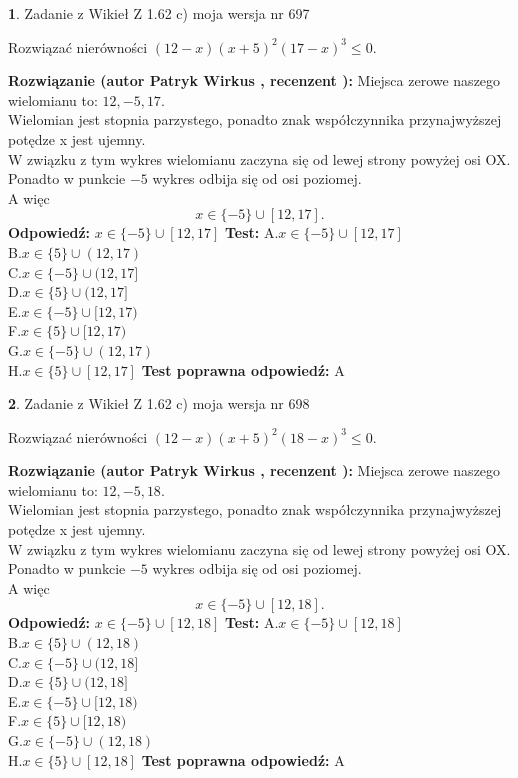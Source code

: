 \documentclass[12pt, a4paper]{article}
\theoremstyle{definition} %
\newtheorem{zad}{}
\newcommand{\zadStart}[1]{\begin{zad}#1\newline}
\newcommand{\zadStop}{\end{zad}}
\newcommand{\rozwStart}[2]{\noindent \textbf{Rozwiązanie (autor #1 , recenzent #2): }\newline}
\newcommand{\rozwStop}{\newline}
\newcommand{\odpStart}{\noindent \textbf{Odpowiedź:}\newline}
\newcommand{\odpStop}{\newline}
\newcommand{\testStart}{\noindent \textbf{Test:}\newline}
\newcommand{\testStop}{\newline}
\newcommand{\kluczStart}{\noindent \textbf{Test poprawna odpowiedź:}\newline}
\newcommand{\kluczStop}{\newline}
\begin{document}
\zadStart{Zadanie z Wikieł Z 1.62 c) moja wersja nr 697}

Rozwiązać nierówności $(12-x)(x+5)^{2}(17-x)^{3}\le0$.
\zadStop
\rozwStart{Patryk Wirkus}{}
Miejsca zerowe naszego wielomianu to: $12, -5, 17$.\\
Wielomian jest stopnia parzystego, ponadto znak współczynnika przy\linebreak najwyższej potędze x jest ujemny.\\ W związku z tym wykres wielomianu zaczyna się od lewej strony powyżej osi OX.\\
Ponadto w punkcie $-5$ wykres odbija się od osi poziomej.\\
A więc $$x \in \{-5\} \cup [12,17].$$
\rozwStop
\odpStart
$x \in \{-5\} \cup [12,17]$
\odpStop
\testStart
A.$x \in \{-5\} \cup [12,17]$\\
B.$x \in \{5\} \cup (12,17)$\\
C.$x \in \{-5\} \cup (12,17]$\\
D.$x \in \{5\} \cup (12,17]$\\
E.$x \in \{-5\} \cup [12,17)$\\
F.$x \in \{5\} \cup [12,17)$\\
G.$x \in \{-5\} \cup (12,17)$\\
H.$x \in \{5\} \cup [12,17]$
\testStop
\kluczStart
A
\kluczStop



\zadStart{Zadanie z Wikieł Z 1.62 c) moja wersja nr 698}

Rozwiązać nierówności $(12-x)(x+5)^{2}(18-x)^{3}\le0$.
\zadStop
\rozwStart{Patryk Wirkus}{}
Miejsca zerowe naszego wielomianu to: $12, -5, 18$.\\
Wielomian jest stopnia parzystego, ponadto znak współczynnika przy\linebreak najwyższej potędze x jest ujemny.\\ W związku z tym wykres wielomianu zaczyna się od lewej strony powyżej osi OX.\\
Ponadto w punkcie $-5$ wykres odbija się od osi poziomej.\\
A więc $$x \in \{-5\} \cup [12,18].$$
\rozwStop
\odpStart
$x \in \{-5\} \cup [12,18]$
\odpStop
\testStart
A.$x \in \{-5\} \cup [12,18]$\\
B.$x \in \{5\} \cup (12,18)$\\
C.$x \in \{-5\} \cup (12,18]$\\
D.$x \in \{5\} \cup (12,18]$\\
E.$x \in \{-5\} \cup [12,18)$\\
F.$x \in \{5\} \cup [12,18)$\\
G.$x \in \{-5\} \cup (12,18)$\\
H.$x \in \{5\} \cup [12,18]$
\testStop
\kluczStart
A
\kluczStop
\end{document}
